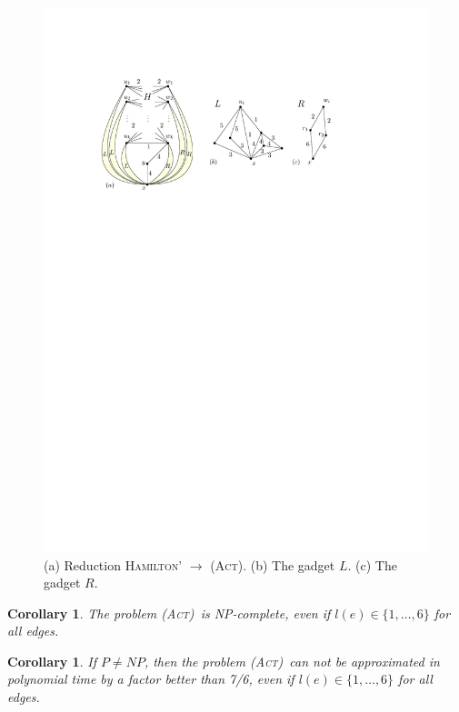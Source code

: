 \documentclass[10pt,a4paper]{article}
\newtheorem{corollary}[theorem]{Corollary}
\numberwithin{equation}{section}
\newcommand{\set}[1]{\{ #1 \}}
\newcommand{\fromto}[2]{\set{#1, \ldots, #2}}
\newcommand{\act}{\textsc{(Act)}}
\begin{document}
\begin{figure}[htpb]
\centering
\includegraphics[scale=1]{img/act-hamilton-cycle}
\caption{(a) Reduction \textsc{Hamilton'} $\rightarrow$ \act. (b) The gadget $L$. (c) The gadget $R$.}
\label{fig_act_hamilton_cycle}
\end{figure}

\begin{corollary}
The problem \act\ is NP-complete, even if $l(e) \in \fromto{1}{6}$ for all edges.
\end{corollary}

\begin{corollary}
\label{corollary_act_no_approx}
If $P \neq NP$, then the problem \act\ can not be approximated in polynomial time by a factor better than 7/6, even if $l(e) \in \fromto{1}{6}$ for all edges. 
\end{corollary}
\end{document}
